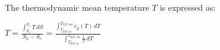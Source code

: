 The thermodynamic mean temperature \( T \) is expressed as:  

\( T = \frac{\int_{S_a}^{S_e} T \, dS}{S_a - S_e} = \frac{\int_{T_{KF,in}}^{T_{KF,out}} c_{p} (T) \, dT}{\int_{T_{KF,in}}^{T_{KF,out}} \frac{1}{T} \, dT} \)